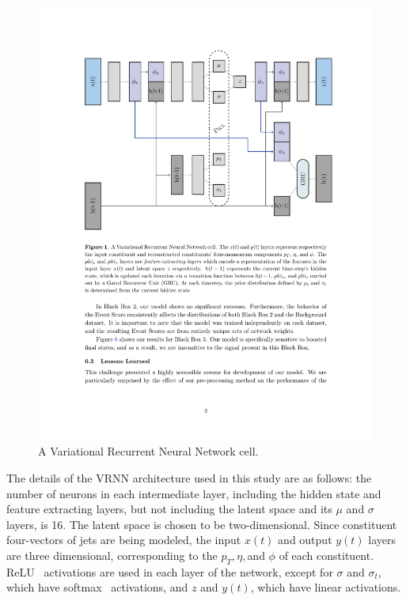 \documentclass[11pt, a4paper]{article}
\begin{document}
\begin{figure}[H]
	\begin{center}
		\includegraphics[width=420pt]{imgs/VRNN_Diagram.pdf}
	\end{center}
	\caption{A Variational Recurrent Neural Network cell.}
	\label{fig:VRNN}
\end{figure}



The details of the VRNN architecture used in this study are as follows: the number of neurons in each intermediate layer, including the hidden state and feature extracting layers, but not including the latent space and its $\mu$ and $\sigma$ layers, is 16. The latent space is chosen to be two-dimensional. Since constituent four-vectors of jets are being modeled, the input $x(t)$ and output $y(t)$ layers are three dimensional, corresponding to the $p_{T}, \eta, $and $\phi$ of each constituent. ReLU~\cite{activations} activations are used in each layer of the network, except for $\sigma$ and $\sigma_{t}$, which have softmax~\cite{activations} activations, and $z$ and $y(t)$, which have linear activations. 
\end{document}
